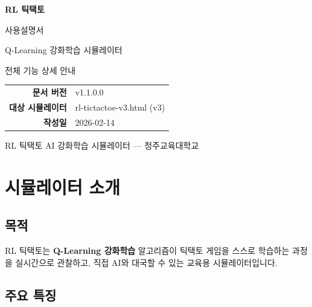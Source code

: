 \documentclass[11pt,a4paper]{article}
\begin{document}
\begin{titlepage}
\centering
\vspace*{3cm}

{\fontsize{48pt}{50pt}\selectfont {}}

\vspace{1cm}

{\Huge\bfseries\color{mainblue} RL 틱택토}

\vspace{0.3cm}

{\LARGE\color{darkbrown} 사용설명서}

\vspace{1.5cm}

{\large Q-Learning 강화학습 시뮬레이터}

\vspace{0.5cm}

{\large 전체 기능 상세 안내}

\vspace{3cm}

\begin{tabular}{rl}
\textbf{문서 버전} & v1.1.0.0 \\
\textbf{대상 시뮬레이터} & rl-tictactoe-v3.html (v3) \\
\textbf{작성일} & 2026-02-14 \\
\end{tabular}

\vfill

{\small\color{lightbrown} RL 틱택토 AI 강화학습 시뮬레이터 — 청주교육대학교}

\end{titlepage}

\tableofcontents
\newpage

\section{시뮬레이터 소개}

\subsection{목적}

RL 틱택토는 \textbf{Q-Learning 강화학습} 알고리즘이 틱택토 게임을 스스로 학습하는 과정을 실시간으로 관찰하고, 직접 AI와 대국할 수 있는 교육용 시뮬레이터입니다.

\subsection{주요 특징}
\end{document}
